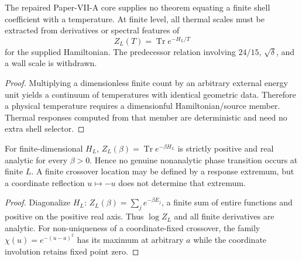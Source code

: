 \documentclass[12pt,a4paper]{article}
\begin{document}
\begin{theorem}
\label{p11:prop:thermal-activation-shell-amplitude}

The repaired Paper-VII-A core supplies no theorem equating a finite shell coefficient with a temperature.  At finite level, all thermal scales must be extracted from derivatives or spectral features of
\[
Z_L(T)=\operatorname{Tr}e^{-H_L/T}
\]
for the supplied Hamiltonian.  The predecessor relation involving \(24/15\), \(\sqrt\delta\), and a wall scale is withdrawn.
\label{p11:eq:thermal-activation-fpi-lock}
\end{theorem}
\begin{proof}

Multiplying a dimensionless finite count by an arbitrary external energy unit yields a continuum of temperatures with identical geometric data.  Therefore a physical temperature requires a dimensionful Hamiltonian/source member.  Thermal responses computed from that member are deterministic and need no extra shell selector.
\end{proof}

\begin{theorem}
\label{p11:prop:native-transition-scaling}
\label{p11:prop:transition-scale-reconciliation}
\label{p11:thm:scalar-shell-saturation-canonical-crossover}

For finite-dimensional \(H_L\), \(Z_L(\beta)=\operatorname{Tr}e^{-\beta H_L}\) is strictly positive and real analytic for every \(\beta>0\).  Hence no genuine nonanalytic phase transition occurs at finite \(L\).  A finite crossover location may be defined by a response extremum, but a coordinate reflection \(u\mapsto-u\) does not determine that extremum.
\label{p11:eq:native-transition-scaling}
\label{p11:eq:thermal-crossover-shell-factor}
\label{p11:eq:thermal-selfdual-equivalence}
\label{p11:eq:zeta-thermal-saturation-one}
\label{p11:eq:canonical-crossover-numeric-symbolic}
\end{theorem}
\begin{proof}

Diagonalize \(H_L\): \(Z_L(\beta)=\sum_j e^{-\beta E_j}\), a finite sum of entire functions and positive on the positive real axis.  Thus \(\log Z_L\) and all finite derivatives are analytic.  For non-uniqueness of a coordinate-fixed crossover, the family \(\chi(u)=e^{-(u-a)^2}\) has its maximum at arbitrary \(a\) while the coordinate involution retains fixed point zero.
\end{proof}
\end{document}
